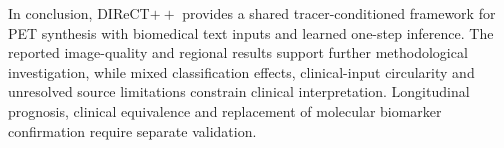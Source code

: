 In conclusion, DIReCT$++$ provides a shared tracer-conditioned framework for PET synthesis with biomedical text inputs and learned one-step inference. The reported image-quality and regional results support further methodological investigation, while mixed classification effects, clinical-input circularity and unresolved source limitations constrain clinical interpretation. Longitudinal prognosis, clinical equivalence and replacement of molecular biomarker confirmation require separate validation.

